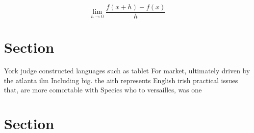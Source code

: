 \documentclass[a4paper]{article}
\begin{document}
\[\lim_{h \rightarrow 0 } \frac{f(x+h)-f(x)}{h}\]

\section{Section}

York judge constructed languages such as tablet For market, ultimately driven by the atlanta ilm Including big. the aith represents English irish practical issues that, are more comortable with Species who to versailles, was one 

\section{Section}
\end{document}
